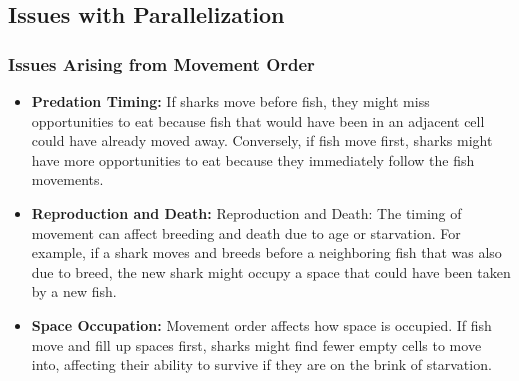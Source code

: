 \documentclass[conference,compsoc]{IEEEtran}
\begin{document}


\subsection{Issues with Parallelization}

\subsubsection{Issues Arising from Movement Order}
\begin{itemize}
    \item \textbf{Predation Timing:} If sharks move before fish, they might miss opportunities to eat because fish that would have been in an adjacent cell could have already moved away. Conversely, if fish move first, sharks might have more opportunities to eat because they immediately follow the fish movements.
    \item \textbf{Reproduction and Death:} Reproduction and Death: The timing of movement can affect breeding and death due to age or starvation. For example, if a shark moves and breeds before a neighboring fish that was also due to breed, the new shark might occupy a space that could have been taken by a new fish.
    \item \textbf{Space Occupation:}  Movement order affects how space is occupied. If fish move and fill up spaces first, sharks might find fewer empty cells to move into, affecting their ability to survive if they are on the brink of starvation.
\end{itemize}
\end{document}
